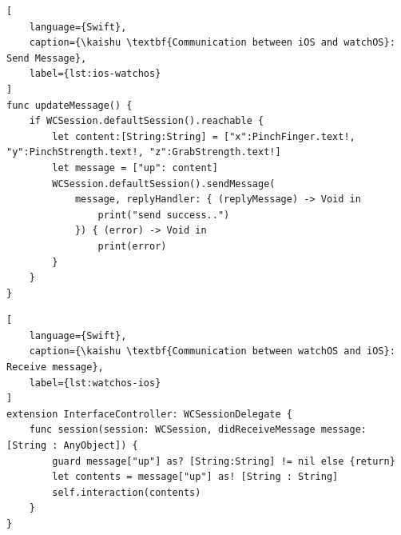 \begin{lstlisting}[
    language={Swift},
    caption={\kaishu \textbf{Communication between iOS and watchOS}: Send Message},
    label={lst:ios-watchos}
]
func updateMessage() {
    if WCSession.defaultSession().reachable {
        let content:[String:String] = ["x":PinchFinger.text!, "y":PinchStrength.text!, "z":GrabStrength.text!]
        let message = ["up": content]
        WCSession.defaultSession().sendMessage(
            message, replyHandler: { (replyMessage) -> Void in
                print("send success..")
            }) { (error) -> Void in
                print(error)
        }
    }
}
\end{lstlisting}
\begin{lstlisting}[
    language={Swift},
    caption={\kaishu \textbf{Communication between watchOS and iOS}: Receive message},
    label={lst:watchos-ios}
]
extension InterfaceController: WCSessionDelegate {
    func session(session: WCSession, didReceiveMessage message: [String : AnyObject]) {
        guard message["up"] as? [String:String] != nil else {return}
        let contents = message["up"] as! [String : String]
        self.interaction(contents)
    }
}
\end{lstlisting}

\cleardoublepage
